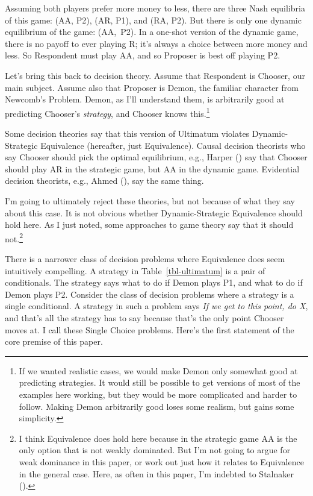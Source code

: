 \documentclass[
  11pt,
  letterpaper,
  DIV=11,
  numbers=noendperiod,
  twoside]{scrartcl}
\begin{document}
Assuming both players prefer more money to less, there are three Nash
equilibria of this game: (AA, P2), (AR, P1), and (RA, P2). But there is
only one dynamic equilibrium of the game: (AA,~P2). In a one-shot
version of the dynamic game, there is no payoff to ever playing R; it's
always a choice between more money and less. So Respondent must play AA,
and so Proposer is best off playing P2.

Let's bring this back to decision theory. Assume that Respondent is
Chooser, our main subject. Assume also that Proposer is Demon, the
familiar character from Newcomb's Problem. Demon, as I'll understand
them, is arbitrarily good at predicting Chooser's \emph{strategy}, and
Chooser knows this.\footnote{If we wanted realistic cases, we would make
  Demon only somewhat good at predicting strategies. It would still be
  possible to get versions of most of the examples here working, but
  they would be more complicated and harder to follow. Making Demon
  arbitrarily good loses some realism, but gains some simplicity.}

Some decision theories say that this version of Ultimatum violates
Dynamic-Strategic Equivalence (hereafter, just Equivalence). Causal
decision theorists who say Chooser should pick the optimal equilibrium,
e.g., Harper () say that Chooser should
play AR in the strategic game, but AA in the dynamic game. Evidential
decision theorists, e.g., Ahmed (), say
the same thing.

I'm going to ultimately reject these theories, but not because of what
they say about this case. It is not obvious whether Dynamic-Strategic
Equivalence should hold here. As I just noted, some approaches to game
theory say that it should not.\footnote{I think Equivalence does hold
  here because in the strategic game AA is the only option that is not
  weakly dominated. But I'm not going to argue for weak dominance in
  this paper, or work out just how it relates to Equivalence in the
  general case. Here, as often in this paper, I'm indebted to Stalnaker
  ().}

There is a narrower class of decision problems where Equivalence does
seem intuitively compelling. A strategy in Table~\ref{tbl-ultimatum} is
a pair of conditionals. The strategy says what to do if Demon plays P1,
and what to do if Demon plays P2. Consider the class of decision
problems where a strategy is a single conditional. A strategy in such a
problem says \emph{If we get to this point, do X}, and that's all the
strategy has to say because that's the only point Chooser moves at. I
call these Single Choice problems. Here's the first statement of the
core premise of this paper.
\end{document}
